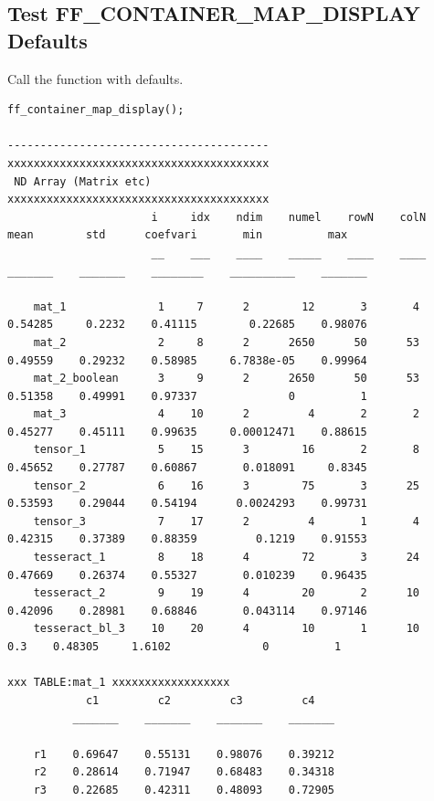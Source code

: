 \documentclass[
]{book}
\begin{document}
\hypertarget{test-ff_container_map_display-defaults}{%
\subsection{Test FF\_CONTAINER\_MAP\_DISPLAY Defaults}\label{test-ff_container_map_display-defaults}}

Call the function with defaults.

\begin{verbatim}
ff_container_map_display();

----------------------------------------
xxxxxxxxxxxxxxxxxxxxxxxxxxxxxxxxxxxxxxxx
 ND Array (Matrix etc)
xxxxxxxxxxxxxxxxxxxxxxxxxxxxxxxxxxxxxxxx
                      i     idx    ndim    numel    rowN    colN     mean        std      coefvari       min          max  
                      __    ___    ____    _____    ____    ____    _______    _______    ________    __________    _______

    mat_1              1     7      2        12       3       4     0.54285     0.2232    0.41115        0.22685    0.98076
    mat_2              2     8      2      2650      50      53     0.49559    0.29232    0.58985     6.7838e-05    0.99964
    mat_2_boolean      3     9      2      2650      50      53     0.51358    0.49991    0.97337              0          1
    mat_3              4    10      2         4       2       2     0.45277    0.45111    0.99635     0.00012471    0.88615
    tensor_1           5    15      3        16       2       8     0.45652    0.27787    0.60867       0.018091     0.8345
    tensor_2           6    16      3        75       3      25     0.53593    0.29044    0.54194      0.0024293    0.99731
    tensor_3           7    17      2         4       1       4     0.42315    0.37389    0.88359         0.1219    0.91553
    tesseract_1        8    18      4        72       3      24     0.47669    0.26374    0.55327       0.010239    0.96435
    tesseract_2        9    19      4        20       2      10     0.42096    0.28981    0.68846       0.043114    0.97146
    tesseract_bl_3    10    20      4        10       1      10         0.3    0.48305     1.6102              0          1

xxx TABLE:mat_1 xxxxxxxxxxxxxxxxxx
            c1         c2         c3         c4   
          _______    _______    _______    _______

    r1    0.69647    0.55131    0.98076    0.39212
    r2    0.28614    0.71947    0.68483    0.34318
    r3    0.22685    0.42311    0.48093    0.72905


\end{verbatim}
\end{document}
